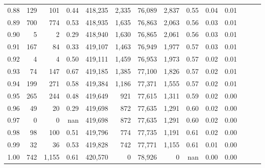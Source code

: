 \begin{tabular}{rrrrrrrrrrrrrr}
0.88 &     129 &    101 &  0.44 &  418,235 &    2,335 &  76,089 &   2,837 &  0.55 &  0.04 &      0.01 \\
0.89 &     700 &    774 &  0.53 &  418,935 &    1,635 &  76,863 &   2,063 &  0.56 &  0.03 &      0.01 \\
0.90 &       5 &      2 &  0.29 &  418,940 &    1,630 &  76,865 &   2,061 &  0.56 &  0.03 &      0.01 \\
0.91 &     167 &     84 &  0.33 &  419,107 &    1,463 &  76,949 &   1,977 &  0.57 &  0.03 &      0.01 \\
0.92 &       4 &      4 &  0.50 &  419,111 &    1,459 &  76,953 &   1,973 &  0.57 &  0.02 &      0.01 \\
0.93 &      74 &    147 &  0.67 &  419,185 &    1,385 &  77,100 &   1,826 &  0.57 &  0.02 &      0.01 \\
0.94 &     199 &    271 &  0.58 &  419,384 &    1,186 &  77,371 &   1,555 &  0.57 &  0.02 &      0.01 \\
0.95 &     265 &    244 &  0.48 &  419,649 &      921 &  77,615 &   1,311 &  0.59 &  0.02 &      0.00 \\
0.96 &      49 &     20 &  0.29 &  419,698 &      872 &  77,635 &   1,291 &  0.60 &  0.02 &      0.00 \\
0.97 &       0 &      0 &   nan &  419,698 &      872 &  77,635 &   1,291 &  0.60 &  0.02 &      0.00 \\
0.98 &      98 &    100 &  0.51 &  419,796 &      774 &  77,735 &   1,191 &  0.61 &  0.02 &      0.00 \\
0.99 &      32 &     36 &  0.53 &  419,828 &      742 &  77,771 &   1,155 &  0.61 &  0.01 &      0.00 \\
1.00 &     742 &  1,155 &  0.61 &  420,570 &        0 &  78,926 &       0 &   nan &  0.00 &      0.00 \\
\bottomrule
\end{tabular}
